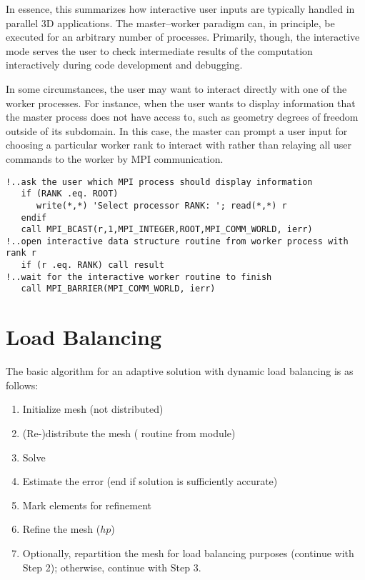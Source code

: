 In essence, this summarizes how interactive user inputs are typically handled in parallel \hp3D applications. The master--worker paradigm can, in principle, be executed for an arbitrary number of processes. Primarily, though, the interactive mode serves the user to check intermediate results of the computation interactively during code development and debugging.

\begin{remark}
In some circumstances, the user may want to interact directly with one of the worker processes. For instance, when the user wants to display information that the master process does not have access to, such as geometry degrees of freedom outside of its subdomain. In this case, the master can prompt a user input for choosing a particular worker rank to interact with rather than relaying all user commands to the worker by MPI communication.
\end{remark}

\begin{lstlisting}[caption=Initiating an interactive worker routine by a master broadcast., label={lst:interactive_mode_worker}]
!..ask the user which MPI process should display information
   if (RANK .eq. ROOT)
      write(*,*) 'Select processor RANK: '; read(*,*) r
   endif
   call MPI_BCAST(r,1,MPI_INTEGER,ROOT,MPI_COMM_WORLD, ierr)
!..open interactive data structure routine from worker process with rank r
   if (r .eq. RANK) call result
!..wait for the interactive worker routine to finish
   call MPI_BARRIER(MPI_COMM_WORLD, ierr)
\end{lstlisting}


\section{Load Balancing}
\label{sec:load-balancing}

The basic algorithm for an adaptive solution with dynamic load balancing is as follows:

\begin{enumerate}
	\itemsep 0pt
	\item Initialize mesh (not distributed)
	\item (Re-)distribute the mesh ( routine from  module)
	\item Solve
	\item Estimate the error (end if solution is sufficiently accurate)
	\item Mark elements for refinement
	\item Refine the mesh ($hp$)
	\item Optionally, repartition the mesh for load balancing purposes (continue with Step 2); otherwise, continue with Step 3.
\end{enumerate}

